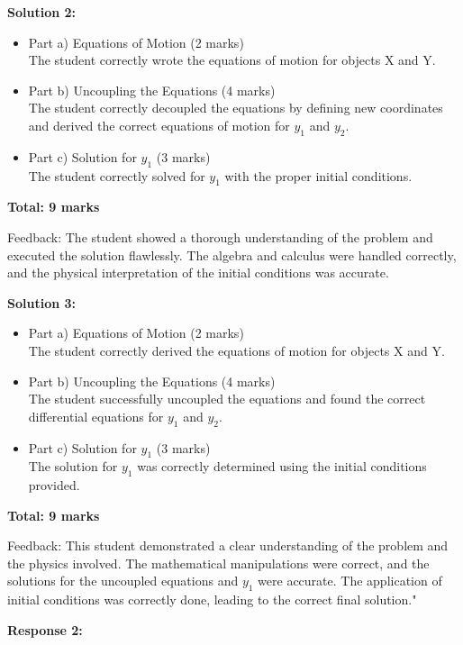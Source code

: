 \documentclass[a4paper,11pt]{article}
\begin{document}
\textbf{Solution 2:}

\begin{itemize}
    \item Part a) Equations of Motion (2 marks) \\
    The student correctly wrote the equations of motion for objects X and Y.
    \item Part b) Uncoupling the Equations (4 marks) \\
    The student correctly decoupled the equations by defining new coordinates and derived the correct equations of motion for \(y_1\) and \(y_2\).
    \item Part c) Solution for \(y_1\) (3 marks) \\
    The student correctly solved for \(y_1\) with the proper initial conditions.
\end{itemize}

\textbf{Total: 9 marks}

Feedback: The student showed a thorough understanding of the problem and executed the solution flawlessly. The algebra and calculus were handled correctly, and the physical interpretation of the initial conditions was accurate.

\textbf{Solution 3:}

\begin{itemize}
    \item Part a) Equations of Motion (2 marks) \\
    The student correctly derived the equations of motion for objects X and Y.
    \item Part b) Uncoupling the Equations (4 marks) \\
    The student successfully uncoupled the equations and found the correct differential equations for \(y_1\) and \(y_2\).
    \item Part c) Solution for \(y_1\) (3 marks) \\
    The solution for \(y_1\) was correctly determined using the initial conditions provided.
\end{itemize}

\textbf{Total: 9 marks}

Feedback: This student demonstrated a clear understanding of the problem and the physics involved. The mathematical manipulations were correct, and the solutions for the uncoupled equations and \(y_1\) were accurate. The application of initial conditions was correctly done, leading to the correct final solution."

\textbf{Response 2:}
\end{document}
